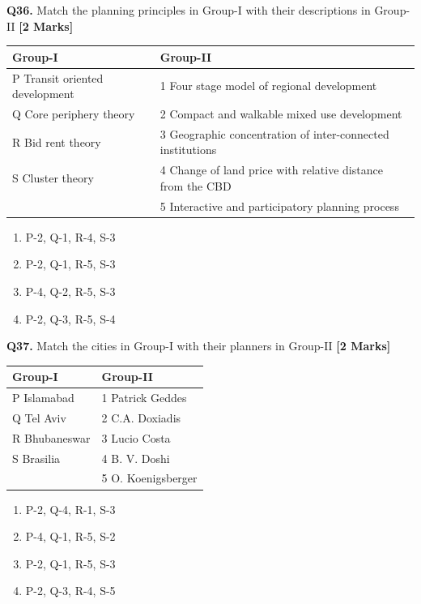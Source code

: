 \documentclass[11pt]{article}
\newcommand{\questionb}[2]{
    \noindent\textbf{Q#2.} #1 \hfill \textbf{[2 Marks]}
}
\begin{document}
\questionb{Match the planning principles in Group-I with their descriptions in Group-II}{36}
\begin{tabularx}{\textwidth}{|l|X|}
\hline
\textbf{Group-I} & \textbf{Group-II} \\
\hline
P Transit oriented development & 1 Four stage model of regional development \\
Q Core periphery theory & 2 Compact and walkable mixed use development \\
R Bid rent theory & 3 Geographic concentration of inter-connected institutions \\
S Cluster theory & 4 Change of land price with relative distance from the CBD \\
 & 5 Interactive and participatory planning process \\
\hline
\end{tabularx}
\begin{enumerate}
    \item[(A)] P-2, Q-1, R-4, S-3
    \item[(B)] P-2, Q-1, R-5, S-3
    \item[(C)] P-4, Q-2, R-5, S-3
    \item[(D)] P-2, Q-3, R-5, S-4
\end{enumerate}
\vspace{0.5cm}

\questionb{Match the cities in Group-I with their planners in Group-II}{37}
\begin{tabularx}{\textwidth}{|l|X|}
\hline
\textbf{Group-I} & \textbf{Group-II} \\
\hline
P Islamabad & 1 Patrick Geddes \\
Q Tel Aviv & 2 C.A. Doxiadis \\
R Bhubaneswar & 3 Lucio Costa \\
S Brasilia & 4 B. V. Doshi \\
 & 5 O. Koenigsberger \\
\hline
\end{tabularx}
\begin{enumerate}
    \item[(A)] P-2, Q-4, R-1, S-3
    \item[(B)] P-4, Q-1, R-5, S-2
    \item[(C)] P-2, Q-1, R-5, S-3
    \item[(D)] P-2, Q-3, R-4, S-5
\end{enumerate}
\vspace{0.5cm}
\end{document}
